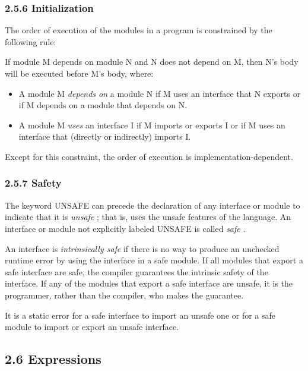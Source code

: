 \documentclass[10pt]{article}
\begin{document}
 
\subsubsection*{2.5.6 Initialization}


  The order of execution of the modules in a program is constrained by the following rule: 


  If module M depends on module N and N does not depend on M, then N's body will be executed before M's body, where: 
\begin{itemize}
\item  A module M \emph{depends on}
 a module N if M uses an interface that N exports or if M depends on a module that depends on N. 
\item  A module M \emph{uses}
 an interface I if M imports or exports I or if M uses an interface that (directly or indirectly) imports I. 
\end{itemize}



  Except for this constraint, the order of execution is implementation-dependent. 


 
\subsubsection*{2.5.7 Safety}


  The keyword UNSAFE can precede the declaration of any interface or module to indicate that it is \emph{unsafe}
; that is, uses the unsafe features of the language. An interface or module not explicitly labeled UNSAFE is called \emph{safe}
. 


 An interface is \emph{intrinsically safe}
 if there is no way to produce an unchecked runtime error by using the interface in a safe module. If all modules that export a safe interface are safe, the compiler guarantees the intrinsic safety of the interface. If any of the modules that export a safe interface are unsafe, it is the programmer, rather than the compiler, who makes the guarantee. 


  It is a static error for a safe interface to import an unsafe one or for a safe module to import or export an unsafe interface. 


 
\subsection*{2.6 Expressions}
\end{document}
